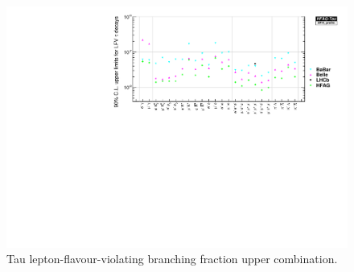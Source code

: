 \begin{figure}[tb]
  \begin{center}

    
    \includegraphics[angle=270,totalheight=0.9\textheight,clip]{figures/tau/TauLFV_UL_2013001_averaged.pdf}
    
    \caption{Tau lepton-flavour-violating branching fraction upper combination.
      \label{fig:tau:lfv-limits-plot_average}
    }
  \end{center}
\end{figure}
